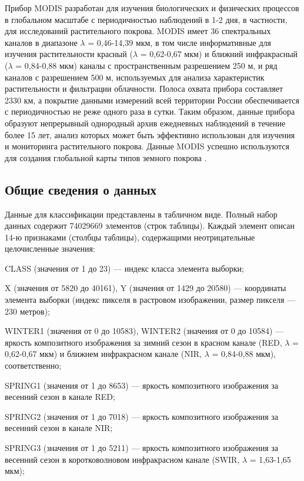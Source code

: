 \documentclass[14pt, a4paper, oneside]{extarticle}
\begin{document}
Прибор MODIS разработан для изучения биологических и физических процессов в глобальном масштабе с периодичностью наблюдений в 1-2 дня, в частности, для исследований растительного покрова. MODIS имеет 36 спектральных каналов в диапазоне $\lambda$ = 0,46-14,39 мкм, в том числе информативные для изучения растительности красный ($\lambda$ = 0,62-0,67 мкм) и ближний инфракрасный ($\lambda$ = 0,84-0,88 мкм) каналы с пространственным разрешением 250 м, и ряд каналов с разрешением 500 м, используемых для анализа характеристик растительности и фильтрации облачности. Полоса охвата прибора составляет 2330 км, а покрытие данными измерений всей территории России обеспечивается с периодичностью не реже одного раза в сутки. Таким образом, данные прибора образуют непрерывный однородный архив ежедневных наблюдений в течение более 15 лет, анализ которых может быть эффективно использован для изучения и мониторинга растительного покрова. Данные MODIS успешно используются для создания глобальной карты типов земного покрова \cite{land-cover-mapping-monograph}.

\subsection{Общие сведения о данных}
Данные для классификации представлены в табличном виде. Полный набор данных содержит 74029669 элементов (строк таблицы). Каждый элемент описан 14-ю признаками (столбцы таблицы), содержащими неотрицательные целочисленные значения:

CLASS (значения от 1 до 23) --- индекс класса элемента выборки;

X (значения от 5820 до 40161), Y (значения от 1429 до 20580) --- координаты элемента выборки (индекс пикселя в растровом изображении, размер пикселя --- 230 метров);

WINTER1 (значения от 0 до 10583), WINTER2 (значения от 0 до 10584) --- яркость композитного изображения за зимний сезон в красном канале (RED, $\lambda$ = 0,62-0,67 мкм) и ближнем инфракрасном канале (NIR, $\lambda$ = 0,84-0,88 мкм), соответственно;

SPRING1 (значения от 1 до 8653) --- яркость композитного изображения за весенний сезон в канале RED;

SPRING2 (значения от 1 до 7018) --- яркость композитного изображения за весенний сезон в канале NIR;

SPRING3 (значения от 1 до 5211) --- яркость композитного изображения за весенний сезон в коротковолновом инфракрасном канале (SWIR, $\lambda$ = 1,63-1,65 мкм);
\end{document}
